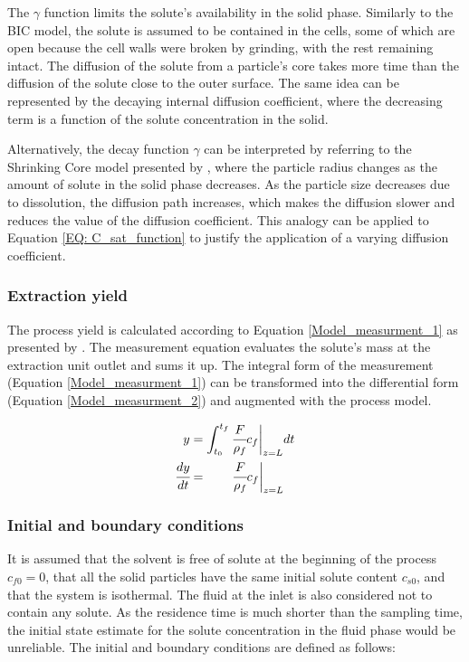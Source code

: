 \documentclass[a4paper,fleqn]{cas-dc}
\begin{document}
		The $\gamma$ function limits the solute's availability in the solid phase. Similarly to the BIC model, the solute is assumed to be contained in the cells, some of which are open because the cell walls were broken by grinding, with the rest remaining intact. The diffusion of the solute from a particle's core takes more time than the diffusion of the solute close to the outer surface. The same idea can be represented by the decaying internal diffusion coefficient, where the decreasing term is a function of the solute concentration in the solid. 
		
		Alternatively, the decay function $\gamma$ can be interpreted by referring to the Shrinking Core model presented by \citet{Goto1996}, where the particle radius changes as the amount of solute in the solid phase decreases. As the particle size decreases due to dissolution, the diffusion path increases, which makes the diffusion slower and reduces the value of the diffusion coefficient. This analogy can be applied to Equation \ref{EQ: C_sat_function} to justify the application of a varying diffusion coefficient.
		
		\subsubsection{Extraction yield} \label{CH: Yield}
		
		The process yield is calculated according to Equation \ref{Model_measurment_1} as presented by \citet{Sovova1994a}. The measurement equation evaluates the solute's mass at the extraction unit outlet and sums it up. The integral form of the measurement (Equation \ref{Model_measurment_1}) can be transformed into the differential form (Equation \ref{Model_measurment_2}) and augmented with the process model.
		
		{\footnotesize
			\begin{align} 
				\label{Model_measurment_1}
				y &= \int_{t_0}^{t_f} \cfrac{F}{\rho_f} c_f \biggr\rvert_{z=L} dt \\
				\cfrac{dy}{dt} &= \qquad \cfrac{F}{\rho_f} c_f \biggr\rvert_{z=L} 
				\label{Model_measurment_2}
		\end{align}	}
		
		\subsubsection{Initial and boundary conditions} 
		It is assumed that the solvent is free of solute at the beginning of the process $c_{f0}=0$, that all the solid particles have the same initial solute content $c_{s0}$, and that the system is isothermal. The fluid at the inlet is also considered not to contain any solute. As the residence time is much shorter than the sampling time, the initial state estimate for the solute concentration in the fluid phase would be unreliable. The initial and boundary conditions are defined as follows:
		
\end{document}
